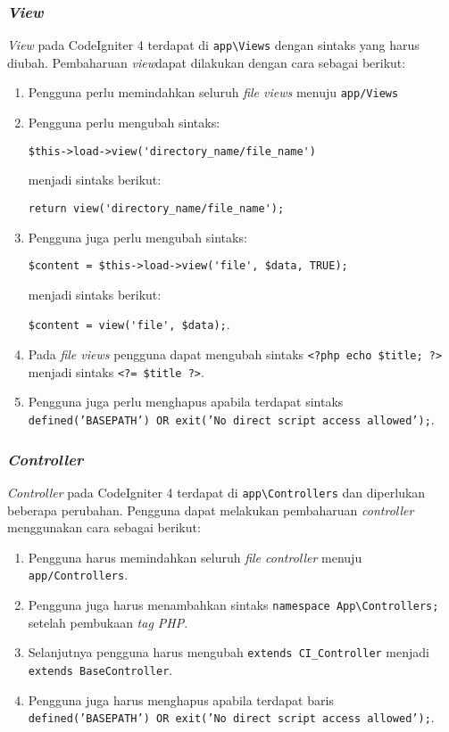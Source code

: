\subsubsection{\textit{View}}
\textit{View} pada CodeIgniter 4 terdapat di \verb|app\Views| dengan sintaks yang harus diubah. Pembaharuan \textit{view}dapat dilakukan dengan cara sebagai berikut:
\begin{enumerate}
\item Pengguna perlu memindahkan seluruh \textit{file views} menuju \verb|app/Views|
\item Pengguna perlu mengubah sintaks:
\begin{center}
	\verb|$this->load->view('directory_name/file_name')|
\end{center}
menjadi sintaks berikut:
\begin{center}
	\verb|return view('directory_name/file_name');|
\end{center}
\item Pengguna juga perlu mengubah sintaks:
\begin{center}
	\verb|$content = $this->load->view('file', $data, TRUE);|
\end{center}	
	 menjadi sintaks berikut:
\begin{center}
	\verb|$content = view('file', $data);|.
\end{center}
\item Pada \textit{file views} pengguna dapat mengubah sintaks \verb|<?php echo $title; ?>| menjadi sintaks \verb|<?= $title ?>|.

\item Pengguna juga perlu menghapus apabila terdapat sintaks \texttt{defined('BASEPATH') OR exit('No direct script access allowed');}.
\end{enumerate}
 
\subsubsection{\textit{Controller}}
\textit{Controller} pada CodeIgniter 4 terdapat di \verb|app\Controllers| dan diperlukan beberapa perubahan. Pengguna dapat melakukan pembaharuan \textit{controller} menggunakan cara sebagai berikut:
\begin{enumerate}
\item Pengguna harus memindahkan seluruh \textit{file controller} menuju \verb|app/Controllers|.
\item Pengguna juga harus menambahkan sintaks \verb|namespace App\Controllers;| setelah pembukaan \textit{tag PHP}.
\item Selanjutnya pengguna harus mengubah \verb|extends CI_Controller| menjadi \verb|extends BaseController|.
\item Pengguna juga harus menghapus apabila terdapat baris \texttt{defined('BASEPATH') OR exit('No direct script access allowed');}.
\end{enumerate}
 
